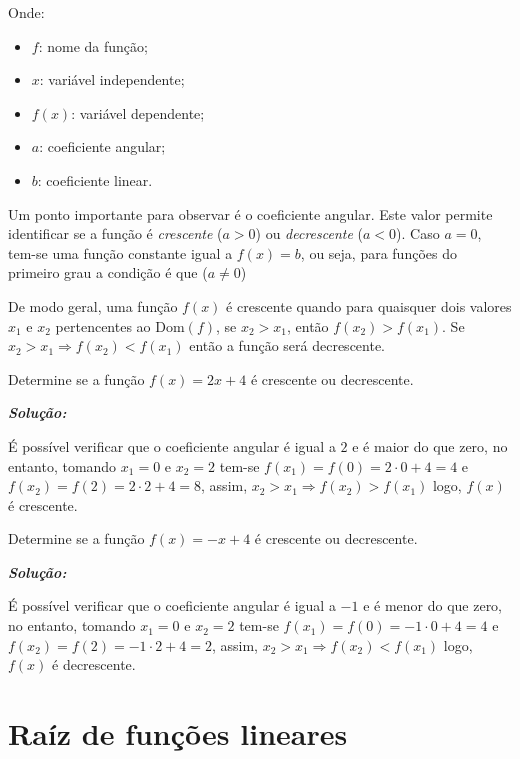 \vspace{.5cm}
Onde:
\begin{itemize}
	\item{$f$: nome da função;}
	\item{$x$: variável independente;}
	\item{$f(x)$: variável dependente;}
	\item{$a$: coeficiente angular;}
	\item{$b$: coeficiente linear.}
\end{itemize}

\vspace{.5cm}

Um ponto importante para observar é o coeficiente angular. Este valor permite identificar se a função é \textit{crescente} ($a>0$) ou \textit{decrescente} ($a<0$). Caso $a=0$, tem-se uma função constante igual a $f(x)=b$, ou seja, para funções do primeiro grau a condição é que ($a \ne 0$)

De modo geral, uma função $f(x)$ é crescente quando para quaisquer dois valores $x_1$ e $x_2$ pertencentes ao $\mathrm{Dom}(f)$, se $x_2 > x_1$, então $f(x_2)>f(x_1)$. Se $x_2>x_1 \Rightarrow f(x_2)<f(x_1)$ então a função será decrescente.


\begin{example} Determine se a função $f(x)=2x+4$ é crescente ou decrescente.

\textit{\textbf{Solução:}}

	É possível verificar que o coeficiente angular é igual a $2$ e é maior do que zero, no entanto, tomando $x_1=0$ e $x_2=2$ tem-se $f(x_1)=f(0)=2\cdot0+4=4$ e $f(x_2)=f(2)=2\cdot2+4=8$, assim, $x_2>x_1\Rightarrow f(x_2)>f(x_1)$ logo, $f(x)$ é crescente.

\end{example}

\begin{example} Determine se a função $f(x)=-x+4$ é crescente ou decrescente.
	
	\textit{\textbf{Solução:}}
	
	É possível verificar que o coeficiente angular é igual a $-1$ e é menor do que zero, no entanto, tomando $x_1=0$ e $x_2=2$ tem-se $f(x_1)=f(0)=-1\cdot0+4=4$ e $f(x_2)=f(2)=-1\cdot2+4=2$, assim, $x_2>x_1\Rightarrow f(x_2)<f(x_1)$ logo, $f(x)$ é decrescente.
	
\end{example}

\section{Raíz de funções lineares}

